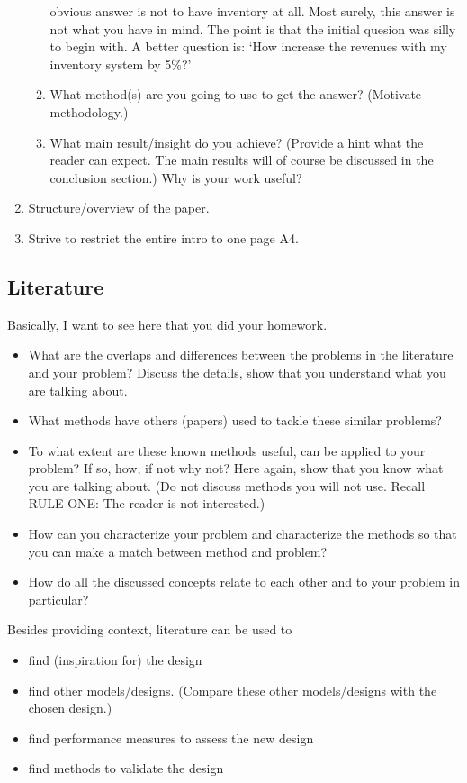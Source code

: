 \documentclass{article}
\begin{document}
\begin{enumerate}
\begin{enumerate}
    obvious answer is not to have inventory at all. Most surely, this
    answer is not what you have in mind. The point is that the initial
    quesion was silly to begin with. A better question is: `How
    increase the revenues with my inventory system by 5\%?'
  \item What method(s) are you going to use to get the answer? (Motivate methodology.)
  \item What main result/insight do you achieve? (Provide a hint what
    the reader can expect. The main results will of course be
    discussed in the conclusion section.) Why is your work useful?
  \end{enumerate}
\item Structure/overview of the paper.
\item Strive to restrict the entire intro to one page A4.
\end{enumerate}



\subsection{Literature}
\label{sec:literature}

Basically, I want to see here that you did your homework. 

\begin{itemize}
\item What are the overlaps and differences between the problems in
  the literature and your problem? Discuss the details, show that you
  understand what you are talking about. 
\item What methods have others (papers) used to tackle these similar
  problems? 
\item To what extent are these known methods useful, can be applied to
  your problem? If so, how, if not why not? Here again, show that you
  know what you are talking about. (Do not discuss methods you will
  not use. Recall RULE ONE: The reader is not interested.)
\item How can you characterize your problem and characterize the
  methods so that you can make a match between method and problem?
\item How do all the discussed concepts relate to each other and to your problem in particular?
\end{itemize}

Besides providing context, literature can  be used to
\begin{itemize}
\item find (inspiration for) the design
\item find other models/designs. (Compare these other models/designs with the chosen design.)
\item find performance measures to assess the new design
\item find methods to validate the design
\end{itemize}
\end{document}

